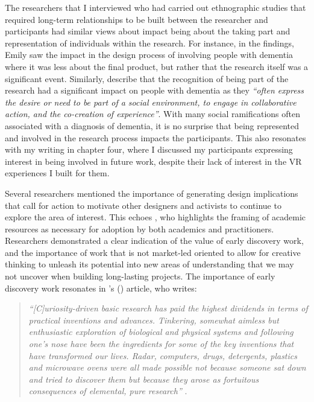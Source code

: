The researchers that I interviewed who had carried out ethnographic studies that required long-term relationships to be built between the researcher and participants had similar views about impact being about the taking part and representation of individuals within the research. For instance, in the findings, Emily saw the impact in the design process of involving people with dementia where it was less about the final product, but rather that the research itself was a significant event. Similarly, \cite{foley_struggle_2019} describe that the recognition of being part of the research had a significant impact on people with dementia as they \textit{``often express the desire or need to be part of a social environment, to engage in collaborative action, and the co-creation of experience''}. With many social ramifications often associated with a diagnosis of dementia, it is no surprise that being represented and involved in the research process impacts the participants. This also resonates with my writing in chapter four, where I discussed my participants expressing interest in being involved in future work, despite their lack of interest in the VR experiences I built for them.

Several researchers mentioned the importance of generating design implications that call for action to motivate other designers and activists to continue to explore the area of interest. This echoes \cite{colusso2017translational}, who highlights the framing of academic resources as necessary for adoption by both academics and practitioners. Researchers demonstrated a clear indication of the value of early discovery work, and the importance of work that is not market-led oriented to allow for creative thinking to unleash its potential into new areas of understanding that we may not uncover when building long-lasting projects. The importance of early discovery work resonates in \citeauthor{jogalekar_2012}'s (\citeyear{jogalekar_2012}) article, who writes: 

\begin{quote}
    
\textit{``[C]uriosity-driven basic research has paid the highest dividends in terms
of practical inventions and advances. Tinkering, somewhat aimless but enthusiastic exploration of biological and physical systems and following one's nose have been the ingredients for some of the key inventions that have transformed our lives. Radar, computers, drugs, detergents, plastics and microwave ovens were all made possible not because someone sat down and tried to discover them but because they arose as fortuitous consequences of elemental, pure research''} \citep{jogalekar_2012}.
\end{quote}

